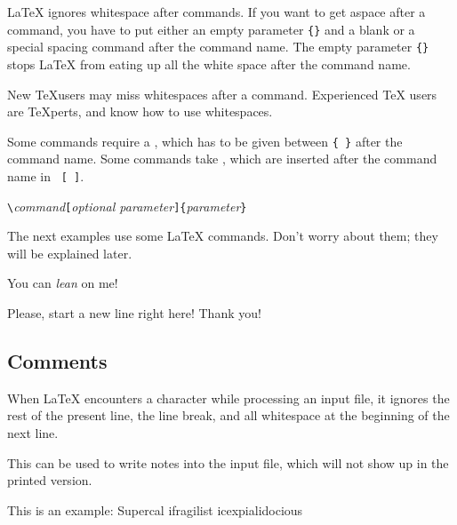 %
%

%
%
\LaTeX{} ignores whitespace after commands. If you want to get aspace after a command, you have to
put either an empty parameter \verb|{}| and a blank or a special spacing command after the
command name. The empty parameter \verb|{}| stops \LaTeX{} from eating up all the white space after
the command name.

\begin{chktexignore}
  \begin{example}
New \TeX users may miss whitespaces
after a command. %
Experienced \TeX{} users are
\TeX perts, and know how to use
whitespaces. %
\end{example}
\end{chktexignore}

Some commands require a , which has to be given between
 \verb|{ }| after the command name. Some commands take
, which are inserted after the command name in
~\verb|[ ]|.
\begin{code}
\verb|\|\textit{command}\verb|[|\textit{optional parameter}\verb|]{|\textit{parameter}\verb|}|
\end{code}
The next examples use some \LaTeX{}
commands. Don't worry about them; they will be explained later.

\begin{example}
You can \textsl{lean} on me!
\end{example}
\begin{example}
Please, start a new line
right here!\newline
Thank you!
\end{example}

\subsection{Comments}

When \LaTeX{} encounters a \ai{\%} character while processing an input file,
it ignores the rest of the present line, the line break, and all
whitespace at the beginning of the next line.

This can be used to write notes into the input file, which will not show up
in the printed version.

\begin{example}
This is an %
example: Supercal%
              ifragilist%
    icexpialidocious
\end{example}

